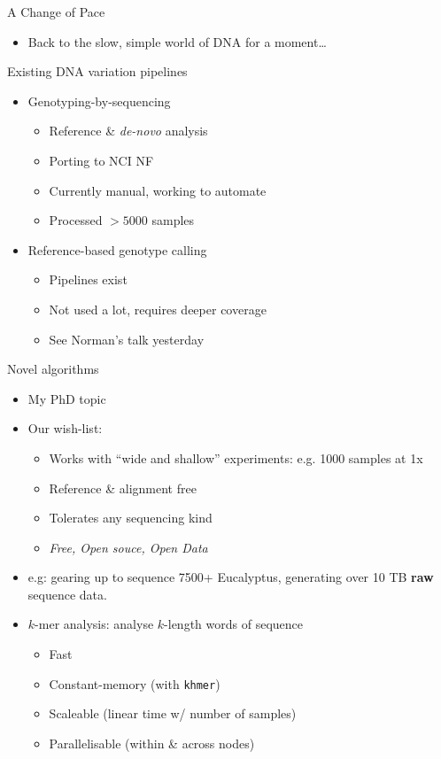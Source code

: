 \documentclass[t]{beamer}
\begin{document}
\begin{frame}[c]{A Change of Pace}
  \begin{itemize}
    \item Back to the slow, simple world of DNA for a moment\ldots
  \end{itemize}
\end{frame}

\begin{frame}{Existing DNA variation pipelines}
  \begin{itemize}
    \item Genotyping-by-sequencing
      \begin{itemize}
        \item Reference \& \textit{de-novo} analysis
        \item Porting to NCI NF
        \item Currently manual, working to automate
        \item Processed $>5000$ samples
      \end{itemize}
    \item Reference-based genotype calling
      \begin{itemize}
        \item Pipelines exist
        \item Not used a lot, requires deeper coverage
        \item See Norman's talk yesterday
      \end{itemize}
  \end{itemize}
\end{frame}

\begin{frame}{Novel algorithms}
  \begin{itemize}
    \item My PhD topic
  \pause
    \item Our wish-list:
    \begin{itemize}
      \item Works with ``wide and shallow'' experiments: e.g. 1000 samples at
            1x
      \item Reference \& alignment free
      \item Tolerates any sequencing kind
      \item \textit{Free, Open souce, Open Data}
    \end{itemize}
  \pause
    \item e.g: gearing up to sequence 7500+ Eucalyptus, generating over 10 TB
      \textbf{raw} sequence data.
  \pause
    \item $k$-mer analysis: analyse $k$-length words of sequence
    \begin{itemize}
      \item Fast
      \item Constant-memory (with \texttt{khmer})
      \item Scaleable (linear time w/ number of samples)
      \item Parallelisable (within \& across nodes)
    \end{itemize}
  \end{itemize}
\end{frame}
\end{document}
